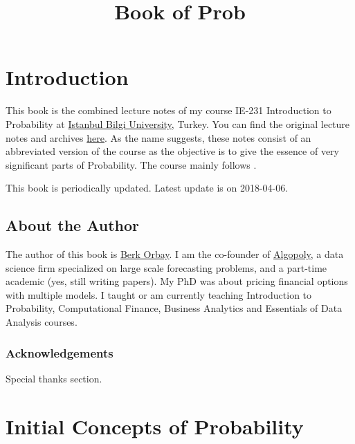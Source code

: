 \documentclass[]{book}
\title{Book of Prob}
\author{}
\date{}
\theoremstyle{definition}
\theoremstyle{definition}
\theoremstyle{definition}
\theoremstyle{remark}
\begin{document}
\maketitle

{
\setcounter{tocdepth}{1}
\tableofcontents
}
\hypertarget{introduction}{%
\chapter*{Introduction}\label{introduction}}

This book is the combined lecture notes of my course IE-231 Introduction
to Probability at \href{https://www.bilgi.edu.tr}{Istanbul Bilgi
University}, Turkey. You can find the original lecture notes and
archives \href{https://berkorbay.github.io/bilgi-ie231/}{here}. As the
name suggests, these notes consist of an abbreviated version of the
course as the objective is to give the essence of very significant parts
of Probability. The course mainly follows \citep{myers2012}.

This book is periodically updated. Latest update is on 2018-04-06.

\hypertarget{about-the-author}{%
\section*{About the Author}\label{about-the-author}}

The author of this book is \href{http://berkorbay.me}{Berk Orbay}. I am
the co-founder of \href{http://algopoly.com}{Algopoly}, a data science
firm specialized on large scale forecasting problems, and a part-time
academic (yes, still writing papers). My PhD was about pricing financial
options with multiple models. I taught or am currently teaching
Introduction to Probability, Computational Finance, Business Analytics
and Essentials of Data Analysis courses.

\hypertarget{acknowledgements}{%
\subsection*{Acknowledgements}\label{acknowledgements}}

Special thanks section.

\hypertarget{intro}{%
\chapter{Initial Concepts of Probability}\label{intro}}
\end{document}

